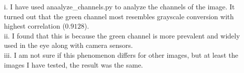 i. I have used anaalyze_channels.py to analyze the channels of the image. It turned out that the green channel most resembles grayscale conversion with highest correlation ($0.9128$). \\
ii. I found that this is because the green channel is more prevalent and widely used in the eye along with camera sensors. \\
iii. I am not sure if this phenomenon differs for other images, but at least the images I have tested, the result was the same.

